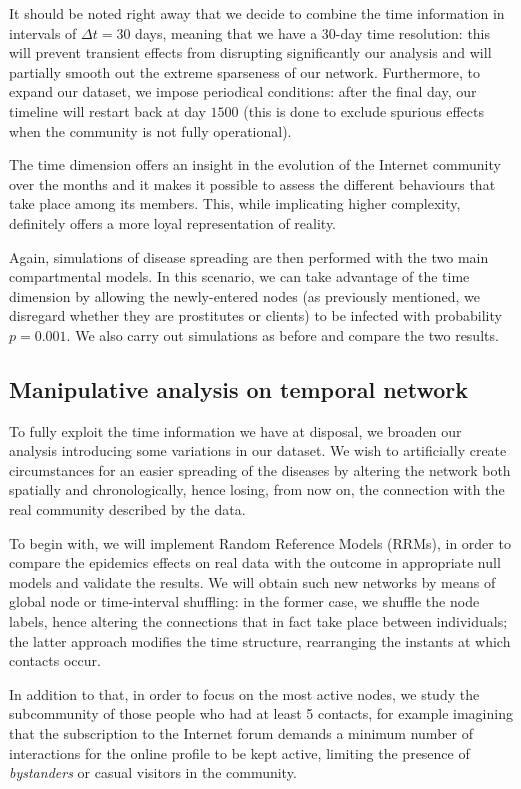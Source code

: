 \documentclass[a4paper,11pt, twocolumn]{article}
\begin{document}
It should be noted right away that we decide to combine the time information in intervals of $\Delta t = 30$ days, meaning that we have a 30-day time resolution: this will prevent transient effects from disrupting significantly our analysis and will partially smooth out the extreme sparseness of our network. Furthermore, to expand our dataset, we impose periodical conditions: after the final day, our timeline will restart back at day $1500$ (this is done to exclude spurious effects when the community is not fully operational).

The time dimension offers an insight in the evolution of the Internet community over the months and it makes it possible to assess the different behaviours that take place among its members. This, while implicating higher complexity, definitely offers a more loyal representation of reality.

Again, simulations of disease spreading are then performed with the two main compartmental models. In this scenario, we can take advantage of the time dimension by allowing the newly-entered nodes (as previously mentioned, we disregard whether they are prostitutes or clients) to be infected with probability $p = 0.001$. We also carry out simulations as before and compare the two results.

\subsection{Manipulative analysis on temporal network}
To fully exploit the time information we have at disposal, we broaden our analysis introducing some variations in our dataset. We wish to artificially create circumstances for an easier spreading of the diseases by altering the network both spatially and chronologically, hence losing, from now on, the connection with the real community described by the data.

To begin with, we will implement Random Reference Models (RRMs), in order to compare the epidemics effects on real data with the outcome in appropriate null models and validate the results. We will obtain such new networks by means of global node or time-interval shuffling: in the former case, we shuffle the node labels, hence altering the connections that in fact take place between individuals; the latter approach modifies the time structure, rearranging the instants at which contacts occur.

In addition to that, in order to focus on the most active nodes, we study the subcommunity of those people who had at least 5 contacts, for example imagining that the subscription to the Internet forum demands a minimum number of interactions for the online profile to be kept active, limiting the presence of \emph{bystanders} or casual visitors in the community. 
\end{document}
